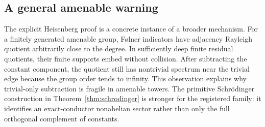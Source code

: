\subsection{A general amenable warning}

The explicit Heisenberg proof is a concrete instance of a broader mechanism.
For a finitely generated amenable group, Følner indicators have adjacency
Rayleigh quotient arbitrarily close to the degree. In sufficiently deep
finite residual quotients, their finite supports embed without collision.
After subtracting the constant component, the quotient still has
nontrivial spectrum near the trivial edge because the group order tends to
infinity. This observation explains why trivial-only subtraction is fragile
in amenable towers. The primitive Schrödinger construction in
Theorem~\ref{thm:schrodinger} is stronger for the registered family: it
identifies an exact-conductor nonabelian sector rather than only the full
orthogonal complement of constants.
